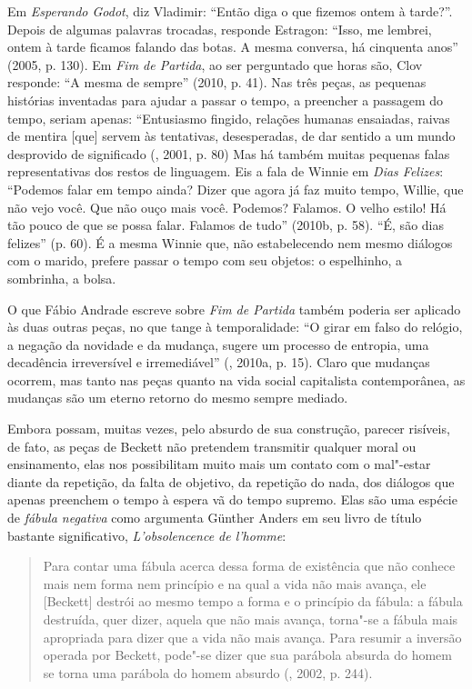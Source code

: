 Em \emph{Esperando Godot}, diz Vladimir: ``Então diga o que fizemos
ontem à tarde?''. Depois de algumas palavras trocadas, responde
Estragon: ``Isso, me lembrei, ontem à tarde ficamos falando das botas. A
mesma conversa, há cinquenta anos'' (2005, p. 130). Em \emph{Fim de
Partida}, ao ser perguntado que horas são, Clov responde: ``A mesma de
sempre'' (2010, p. 41). Nas três peças, as pequenas histórias inventadas
para ajudar a passar o tempo, a preencher a passagem do tempo, seriam
apenas: ``Entusiasmo fingido, relações humanas ensaiadas, raivas de
mentira [que] servem às tentativas, desesperadas, de dar sentido a
um mundo desprovido de significado (, 2001, p. 80) Mas há também
muitas pequenas falas representativas dos restos de linguagem. Eis a
fala de Winnie em \emph{Dias Felizes}: ``Podemos falar em tempo
ainda? Dizer que agora já faz muito tempo, Willie, que não vejo você.
Que não ouço mais você. Podemos? Falamos. O velho estilo! Há tão pouco
de que se possa falar. Falamos de tudo'' (2010b, p. 58). ``É, são dias
felizes'' (p. 60). É a mesma Winnie que, não estabelecendo nem mesmo
diálogos com o marido, prefere passar o tempo com seu objetos: o
espelhinho, a sombrinha, a bolsa.

O que Fábio Andrade escreve sobre \emph{Fim de Partida} também poderia
ser aplicado às duas outras peças, no que tange à temporalidade: ``O
girar em falso do relógio, a negação da novidade e da mudança, sugere um
processo de entropia, uma decadência irreversível e irremediável''
(, 2010a, p. 15). Claro que mudanças ocorrem, mas tanto nas peças
quanto na vida social capitalista contemporânea, as mudanças são um
eterno retorno do mesmo sempre mediado.

Embora possam, muitas vezes, pelo absurdo de sua construção, parecer
risíveis, de fato, as peças de Beckett não pretendem transmitir qualquer
moral ou ensinamento, elas nos possibilitam muito mais um contato com o
mal"-estar diante da repetição, da falta de objetivo, da repetição do
nada, dos diálogos que apenas preenchem o tempo à espera vã do tempo
supremo. Elas são uma espécie de \emph{fábula negativa} como argumenta
Günther Anders em seu livro de título bastante significativo,
\emph{L'obsolencence de l'homme}:

\begin{quote}
Para contar uma fábula acerca dessa forma de existência que não conhece
mais nem forma nem princípio e na qual a vida não mais avança, ele
[Beckett] destrói ao mesmo tempo a forma e o princípio da fábula: a
fábula destruída, quer dizer, aquela que não mais avança, torna"-se a
fábula mais apropriada para dizer que a vida não mais avança. Para
resumir a inversão operada por Beckett, pode"-se dizer que sua parábola
absurda do homem se torna uma parábola do homem absurdo (, 2002, p. 244).
\end{quote}

